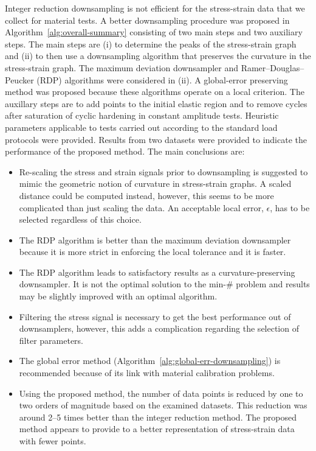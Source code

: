 \documentclass[a4paper,11pt]{article}
\begin{document}
Integer reduction downsampling is not efficient for the stress-strain data that we collect for material tests.
A better downsampling procedure was proposed in Algorithm~\ref{alg:overall-summary} consisting of two main steps and two auxiliary steps.
The main steps are (i) to determine the peaks of the stress-strain graph and (ii) to then use a downsampling algorithm that preserves the curvature in the stress-strain graph.
The maximum deviation downsampler and Ramer–Douglas–Peucker (RDP) algorithms were considered in (ii).
A global-error preserving method was proposed because these algorithms operate on a local criterion.
The auxillary steps are to add points to the initial elastic region and to remove cycles after saturation of cyclic hardening in constant amplitude tests.
Heuristic parameters applicable to tests carried out according to the standard load protocols were provided.
Results from two datasets were provided to indicate the performance of the proposed method.
The main conclusions are:
\begin{itemize}
    \item Re-scaling the stress and strain signals prior to downsampling is suggested to mimic the geometric notion of curvature in stress-strain graphs. A scaled distance could be computed instead, however, this seems to be more complicated than just scaling the data. An acceptable local error, $\epsilon$, has to be selected regardless of this choice.
    \item The RDP algorithm is better than the maximum deviation downsampler because it is more strict in enforcing the local tolerance and it is faster.
    \item The RDP algorithm leads to satisfactory results as a curvature-preserving downsampler. It is not the optimal solution to the min-\# problem and results may be slightly improved with an optimal algorithm.
    \item Filtering the stress signal is necessary to get the best performance out of downsamplers, however, this adds a complication regarding the selection of filter parameters.
    \item The global error method (Algorithm~\ref{alg:global-err-downsampling}) is recommended because of its link with material calibration problems.
    \item Using the proposed method, the number of data points is reduced by one to two orders of magnitude based on the examined datasets. This reduction was around 2--5 times better than the integer reduction method. The proposed method appears to provide to a better representation of stress-strain data with fewer points.
\end{itemize}
\end{document}
